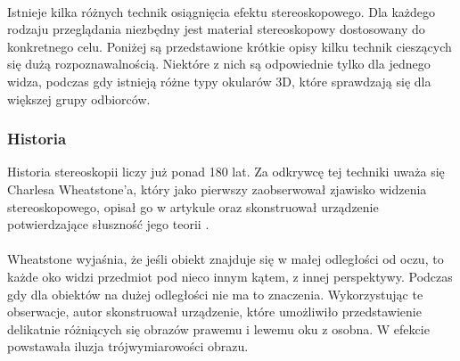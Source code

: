\paragraph{} Istnieje kilka różnych technik osiągnięcia efektu stereoskopowego. Dla każdego rodzaju przeglądania niezbędny jest materiał stereoskopowy dostosowany do konkretnego celu. Poniżej są przedstawione krótkie opisy kilku technik cieszących się dużą rozpoznawalnością. Niektóre z nich są odpowiednie tylko dla jednego widza, podczas gdy istnieją różne typy okularów 3D, które sprawdzają się dla większej grupy odbiorców.
\subsubsection{Historia} 
Historia stereoskopii liczy już ponad 180 lat. Za odkrywcę tej techniki uważa się Charlesa Wheatstone'a, który jako pierwszy zaobserwował zjawisko widzenia stereoskopowego, opisał go w artykule \cite{wheatstone} oraz skonstruował urządzenie potwierdzające słuszność jego teorii \cite{stereoscopehistory}.
\paragraph{} Wheatstone wyjaśnia, że jeśli obiekt znajduje się w małej odległości od oczu, to każde oko widzi przedmiot pod nieco innym kątem, z innej perspektywy. Podczas gdy dla obiektów na dużej odległości nie ma to znaczenia. Wykorzystując te obserwacje, autor skonstruował urządzenie, które umożliwiło przedstawienie delikatnie różniących się obrazów prawemu i lewemu oku z osobna. W efekcie powstawała iluzja trójwymiarowości obrazu.

